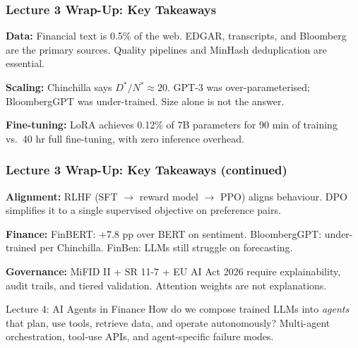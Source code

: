 \documentclass[9pt,t]{beamer}
\begin{document}
\begin{frame}
\frametitle{Lecture 3 Wrap-Up: Key Takeaways}

\textbf{Data:} Financial text is 0.5\% of the web. EDGAR, transcripts, and Bloomberg
are the primary sources. Quality pipelines and MinHash deduplication are essential.

\medskip
\textbf{Scaling:} Chinchilla says $D^*/N^* \approx 20$. GPT-3 was over-parameterised;
BloombergGPT was under-trained. Size alone is not the answer.

\medskip
\textbf{Fine-tuning:} LoRA achieves 0.12\% of 7B parameters for 90 min of training
vs.\ 40 hr full fine-tuning, with zero inference overhead.
\end{frame}

\begin{frame}
\frametitle{Lecture 3 Wrap-Up: Key Takeaways (continued)}

\textbf{Alignment:} RLHF (SFT $\to$ reward model $\to$ PPO) aligns behaviour.
DPO simplifies it to a single supervised objective on preference pairs.

\medskip
\textbf{Finance:} FinBERT: +7.8 pp over BERT on sentiment. BloombergGPT: under-trained
per Chinchilla. FinBen: LLMs still struggle on forecasting.

\medskip
\textbf{Governance:} MiFID II + SR 11-7 + EU AI Act 2026 require explainability,
audit trails, and tiered validation. Attention weights are not explanations.

\medskip
\begin{block}{Lecture 4: AI Agents in Finance}
  How do we compose trained LLMs into \emph{agents} that plan, use tools, retrieve
  data, and operate autonomously? Multi-agent orchestration, tool-use APIs,
  and agent-specific failure modes.
\end{block}
\end{frame}

\end{document}
